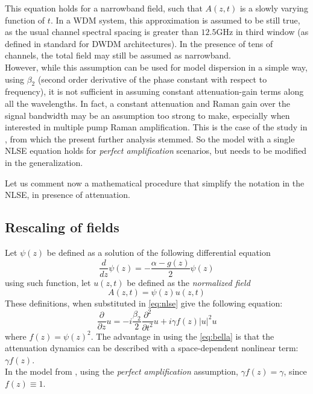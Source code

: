 \documentclass[10pt, lettersize, journal, onecolumn]{IEEEtran}
\begin{document}
    This equation holds for a narrowband field, such that $A(z, t)$ is a slowly varying function of $t$.
    In a WDM system, this approximation is assumed to be still true, as the usual channel spectral spacing is greater than $12.5$GHz  in third window (as defined in standard \cite{ITU-T} for DWDM architectures). In the presence of tens of channels, the total field may still be assumed as narrowband. \\
	However, while this assumption can be used for model dispersion in a simple way, using $\beta_2$ (second order derivative of the phase constant with respect to frequency), it is not sufficient in assuming constant attenuation-gain terms along all the wavelengths. In fact, a constant attenuation and Raman gain over the signal bandwidth may be an assumption too strong to make, especially when interested in multiple pump Raman amplification. This is the case of the study in \cite{Marcon_2021}, from which the present further analysis stemmed.
	So the model with a single NLSE equation holds for \textit{perfect amplification} scenarios, but needs to be modified in the generalization.
   
   Let us comment now a mathematical procedure that simplify the notation in the NLSE, in presence of attenuation.
\subsection{Rescaling of fields}\label{ss:rescaling}
Let $\psi(z)$ be defined as a solution of the following differential equation
\begin{equation}
 \frac{d}{dz}\psi(z) = -\frac{\alpha-g(z)}{2} \psi(z)
\end{equation}
using such function, let $u(z, t)$ be defined as the \textit{normalized field}
\begin{equation}
 A(z, t) = \psi(z)u(z, t)
\end{equation}
These definitions, when substituted in \ref{eq:nlse} give the following equation:
\begin{equation}\label{eq:bella}
 \frac{\partial}{\partial z} u = - i \frac{\beta_2}{2} \frac{\partial^2}{\partial t^2} u + i \gamma f(z) |u|^2 u
\end{equation}
where $f(z) = \psi(z)^2$. The advantage in using the \ref{eq:bella} is that the attenuation dynamics can be described with a space-dependent nonlinear term: $\gamma f(z)$. \\
In the model from \cite{Dar_2013}, using the \textit{perfect amplification} assumption, $\gamma f(z) = \gamma$, since $f(z) \equiv 1$.
\end{document}
